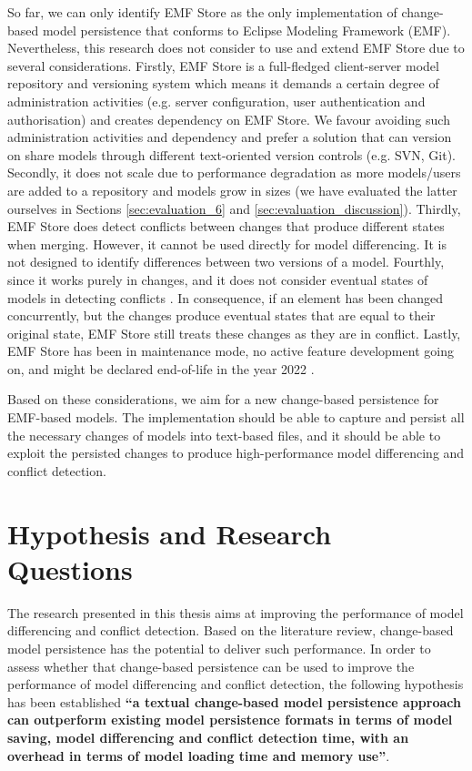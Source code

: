 So far, we can only identify EMF Store as the only implementation of change-based model persistence that conforms to Eclipse Modeling Framework (EMF). Nevertheless, this research does not consider to use and extend EMF Store due to several considerations. Firstly, EMF Store is a full-fledged client-server model repository and versioning system which means it demands a certain degree of administration activities (e.g. server configuration, user authentication and authorisation) and creates dependency on EMF Store. We favour avoiding such administration activities and dependency and prefer a solution that can version on share models through different text-oriented version controls (e.g. SVN, Git). Secondly, it does not scale due to performance degradation as more models/users are added to a repository and models grow in sizes \cite{KolovosRMPGCLRV13} (we have evaluated the latter ourselves in Sections \ref{sec:evaluation_6} and \ref{sec:evaluation_discussion}). Thirdly, EMF Store does detect conflicts between changes that produce different states when merging. However, it cannot be used directly for model differencing. It is not designed to identify differences between two versions of a model. Fourthly, since it works purely in changes, and it does not consider eventual states of models in detecting conflicts \cite{DBLP:conf/sfm/BroschKLSWW12}. In consequence, if an element has been changed concurrently, but the changes produce eventual states that are equal to their original state, EMF Store still treats these changes as they are in conflict. Lastly, EMF Store has been in maintenance mode, no active feature development going on, and might be declared end-of-life in the year 2022 \cite{emfstore2019what}.

Based on these considerations, we aim for a new change-based persistence for EMF-based models. The implementation should be able to capture and persist all the necessary changes of models into text-based files, and it should be able to exploit the persisted changes to produce high-performance model differencing and conflict detection.

\section{Hypothesis and Research Questions}
\label{sec:research_questions}
The research presented in this thesis aims at improving the performance of model differencing and conflict detection. Based on the literature review, change-based model persistence has the potential to deliver such performance. In order to assess whether that change-based persistence can be used to improve the performance of model differencing and conflict detection, the following hypothesis has been established \textbf{``a textual change-based model persistence approach can outperform existing model persistence formats in terms of model saving, model differencing and conflict detection time, with an overhead in terms of model loading time and memory use''}. 

